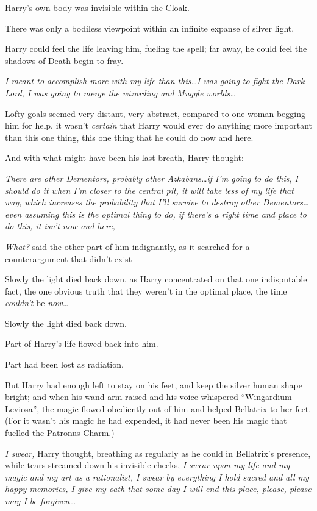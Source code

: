 Harry’s own body was invisible within the Cloak.

There was only a bodiless viewpoint within an infinite expanse of silver light.

Harry could feel the life leaving him, fueling the spell; far away, he could feel the shadows of Death begin to fray.

\emph{I meant to accomplish more with my life than this…I was going to fight the Dark Lord, I was going to merge the wizarding and Muggle worlds…}

Lofty goals seemed very distant, very abstract, compared to one woman begging him for help, it wasn’t \emph{certain} that Harry would ever do anything more important than this one thing, this one thing that he could do now and here.

And with what might have been his last breath, Harry thought:

\emph{There are other Dementors, probably other Azkabans…if I’m going to do this, I should do it when I’m closer to the central pit, it will take less of my life that way, which increases the probability that I’ll survive to destroy other Dementors…even assuming this is the optimal thing to do, if there’s a right time and place to do this, it isn’t now and here, }

\emph{What?} said the other part of him indignantly, as it searched for a counterargument that didn’t exist—

Slowly the light died back down, as Harry concentrated on that one indisputable fact, the one obvious truth that they weren’t in the optimal place, the time \emph{couldn’t} be \emph{now…}

Slowly the light died back down.

Part of Harry’s life flowed back into him.

Part had been lost as radiation.

But Harry had enough left to stay on his feet, and keep the silver human shape bright; and when his wand arm raised and his voice whispered “Wingardium Leviosa”, the magic flowed obediently out of him and helped Bellatrix to her feet. (For it wasn’t his magic he had expended, it had never been his magic that fuelled the Patronus Charm.)

\emph{I swear,} Harry thought, breathing as regularly as he could in Bellatrix’s presence, while tears streamed down his invisible cheeks, \emph{I swear upon my life and my magic and my art as a rationalist, I swear by everything I hold sacred and all my happy memories, I give my oath that some day I will end this place, please, please may I be forgiven…}

